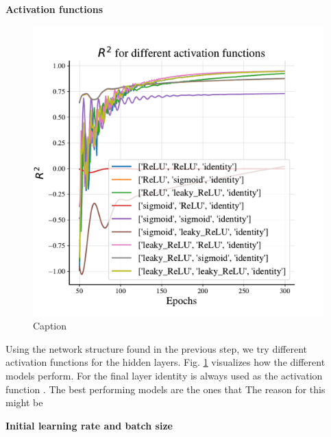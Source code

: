 \textbf{Activation functions}

\begin{figure}
    \centering
    \includegraphics[width=1.0\linewidth]{project_2/figures/$R^2$ for different activation functions_continuous.pdf}
    \caption{Caption}
    \label{fig:activation_franke}
\end{figure}

Using the network structure found in the previous step, we try different activation functions for the  hidden layers. Fig. \ref{fig:activation_franke} visualizes how the different models perform. For the final layer identity is always used as the activation function . 
The best performing models are the ones that 
The reason for this might be 

\textbf{Initial learning rate and batch size}

